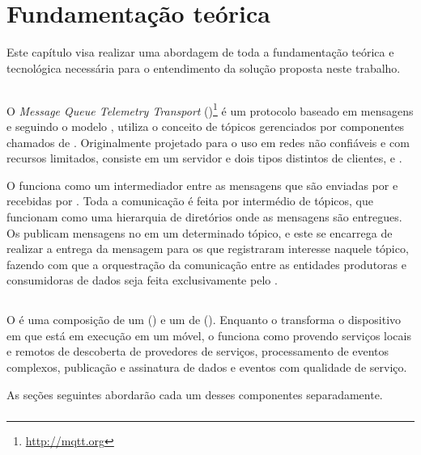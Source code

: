 \chapter{Fundamentação teórica} \label{chap:fundamentacao}

Este capítulo visa realizar uma abordagem de toda a fundamentação teórica e tecnológica necessária para o entendimento da solução proposta neste trabalho.

\section{\mqtt}

O \textit{Message Queue Telemetry Transport} (\mqtt)\footnote{\url{http://mqtt.org}} é um protocolo baseado em mensagens e seguindo o modelo \pubsub, utiliza o conceito de tópicos gerenciados por componentes chamados de \brokers. Originalmente projetado para o uso em redes não confiáveis e com recursos limitados, consiste em um servidor \broker e dois tipos distintos de clientes, \pubs e \subs \cite{lee:et-al:2013}.

O \broker funciona como um intermediador entre as mensagens que são enviadas por \pubs e recebidas por \subs. Toda a comunicação é feita por intermédio de tópicos, que funcionam como uma hierarquia de diretórios onde as mensagens são entregues. Os \pubs publicam mensagens no \broker em um determinado tópico, e este se encarrega de realizar a entrega da mensagem para os \subs que registraram interesse naquele tópico, fazendo com que a orquestração da comunicação entre as entidades produtoras e consumidoras de dados seja feita exclusivamente pelo \broker.

\section{\mhubcddl}

O \mhubcddl é uma composição de um \gateway (\mhub) e um \middleware de \iomt (\cddl). Enquanto o \mhub transforma o dispositivo \android em que está em execução em um \gateway \iot móvel, o \cddl funciona como \middleware provendo serviços locais e remotos de descoberta de provedores de serviços, processamento de eventos complexos, publicação e assinatura de dados e eventos com qualidade de serviço.

As seções seguintes abordarão cada um desses componentes separadamente.

\subsection{\mhub}


